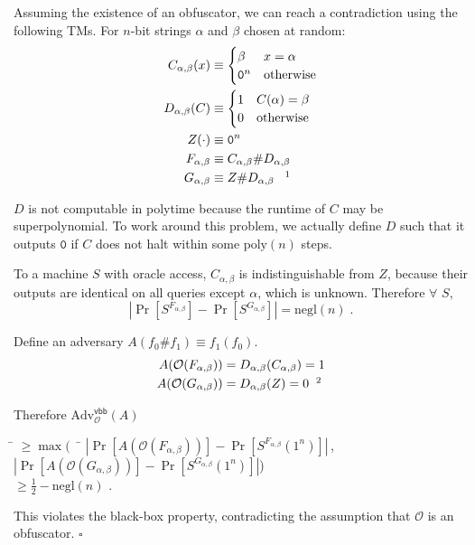 \documentclass[10pt,twocolumn]{article}
\newcommand{\abs}[1]{{\ensuremath{\left\vert#1\right\vert}}}
\def\zero{\texttt{0}}
\def\obf{\ensuremath{\mathcal{O}}}
\def\negl{\text{negl}}
\def\poly{\text{poly}}
\def\Adv{\text{Adv}}
\def\qed{\hfill \ensuremath{\square}}
\def\vbb{\textsf{vbb}}
\begin{document}
    Assuming the existence of an obfuscator, we can reach a contradiction using the following TMs.
    For $n$-bit strings $\alpha$ and $\beta$ chosen at random:
    \begin{align*}
      C_{\alpha,\beta}(x) & \equiv \begin{cases} \beta & x=\alpha \\ \zero^n  & \text{otherwise} \end{cases} \\
      D_{\alpha, \beta}(C) & \equiv \begin{cases} 1 & C(\alpha) = \beta \\ 0 & \text{otherwise} \end{cases} \\
      Z(\cdot) & \equiv \zero^n \\
      F_{\alpha, \beta} & \equiv C_{\alpha, \beta} \# D_{\alpha, \beta} \\
      G_{\alpha, \beta} & \equiv Z \# D_{\alpha, \beta} \;\;\;\footnotemark
    \end{align*}

    $D$ is not computable in polytime because the runtime of $C$ may be superpolynomial.
    To work around this problem, we actually define $D$ such that it outputs $\zero$ if $C$
    does not halt within some $\poly(n)$ steps.

    To a machine $S$ with oracle access, $C_{\alpha,\beta}$ is indistinguishable from $Z$,
    because their outputs are identical on all queries except $\alpha$, which is unknown.
    Therefore $\forall$ $S$,
    \[ \abs{\Pr[S^{F_{\alpha,\beta}}] - \Pr[S^{G_{\alpha,\beta}}]} = \negl(n) \;. \]

    Define an adversary $A(f_0\#f_1) \equiv f_1(f_0)$.
    \begin{align*}
      A(\obf(F_{\alpha,\beta})) & = D_{\alpha,\beta}(C_{\alpha,\beta}) = 1\\
      A(\obf(G_{\alpha,\beta})) & = D_{\alpha,\beta}(Z) = 0 \;\;\footnotemark
    \end{align*}

    Therefore $\Adv^\vbb_\obf(A)$
    \begin{tabbing}
      \hspace{2em} \= $\ge \max(\;\;$ \= $\abs{ \Pr[ A(\obf(F_{\alpha,\beta})) ] - \Pr[ S^{F_{\alpha,\beta}}(1^n) ] }$\,, \\[5pt]
                   \>                 \> $\abs{ \Pr[ A(\obf(G_{\alpha,\beta})) ] - \Pr[ S^{G_{\alpha,\beta}}(1^n) ] }$\;\;) \\[5pt]
                   \> $\ge \frac{1}{2} - \negl(n)$ .
    \end{tabbing}
    This violates the black-box property, contradicting the assumption that $\obf$ is an obfuscator. \qed
\end{document}
